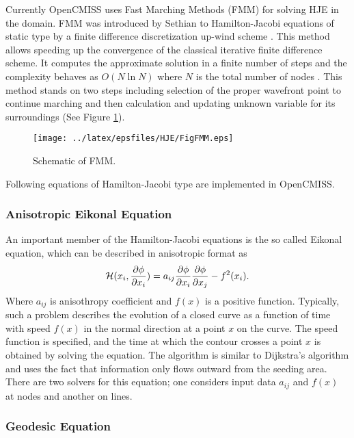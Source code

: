 \noindent Currently OpenCMISS uses Fast Marching Methods (FMM) for solving HJE in the domain. FMM was introduced by Sethian to Hamilton-Jacobi equations of static type by a finite difference discretization up-wind scheme \cite{sethian:1996}. This method allows speeding up the convergence of the classical iterative finite difference scheme. It computes the approximate solution in a finite number of steps and the complexity behaves as $O(N\ln N)$ where $N$ is the total number of nodes \cite{mauch:2003}. This method stands on two steps including selection of the proper wavefront point to continue marching and then calculation and updating unknown variable for its surroundings (See Figure \ref{fig:FMM}).

\begin{figure}[h!]
  \centering
    \texttt{[image: ../latex/epsfiles/HJE/FigFMM.eps]}
  \caption{Schematic of FMM.}
  \label{fig:FMM}
\end{figure}

Following equations of Hamilton-Jacobi type are implemented in OpenCMISS.

\subsubsection{Anisotropic Eikonal Equation}

An important member of the Hamilton-Jacobi equations is the so called Eikonal equation, which can be described in anisotropic format as 
\begin{equation}
\mathcal{H}(x_i, \dfrac{\partial \phi}{\partial x_{i}} ) = a_{ij} \dfrac{\partial \phi}{\partial x_{i}}  \dfrac{\partial \phi}{\partial x_{j}}  - f^2(x_i).
\end{equation}
Where $a_{ij}$ is anisothropy coefficient and $f(x)$ is a positive function. Typically, such a problem describes the evolution of a closed curve as a function of time with speed $f(x)$ in the normal direction at a point $x$ on the curve. The speed function is specified, and the time at which the contour crosses a point $x$ is obtained by solving the equation. The algorithm is similar to Dijkstra's algorithm and uses the fact that information only flows outward from the seeding area. There are two solvers for this equation; one considers input data $a_{ij}$ and $f(x)$ at nodes and another on lines.

\subsubsection{Geodesic Equation}

